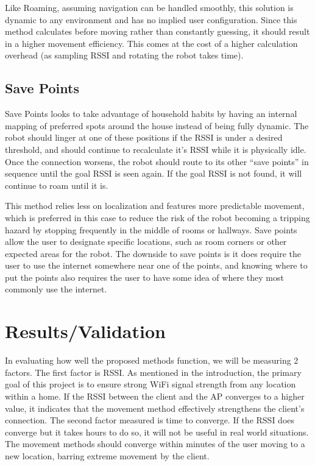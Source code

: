   

Like Roaming, assuming navigation can be handled smoothly, this solution is dynamic to any environment and has no implied user configuration. Since this method calculates before moving rather than constantly guessing, it should result in a higher movement efficiency. This comes at the cost of a higher calculation overhead (as sampling RSSI and rotating the robot takes time).

  

\subsection{Save Points}

Save Points looks to take advantage of household habits by having an internal mapping of preferred spots around the house instead of being fully dynamic. The robot should linger at one of these positions if the RSSI is under a desired threshold, and should continue to recalculate it’s RSSI while it is physically idle. Once the connection worsens, the robot should route to its other “save points” in sequence until the goal RSSI is seen again. If the goal RSSI is not found, it will continue to roam until it is.

  

This method relies less on localization and features more predictable movement, which is preferred in this case to reduce the risk of the robot becoming a tripping hazard by stopping frequently in the middle of rooms or hallways. Save points allow the user to designate specific locations, such as room corners or other expected areas for the robot. The downside to save points is it does require the user to use the internet somewhere near one of the points, and knowing where to put the points also requires the user to have some idea of where they most commonly use the internet.

  

\section{Results/Validation}

In evaluating how well the proposed methods function, we will be measuring 2 factors. The first factor is RSSI. As mentioned in the introduction, the primary goal of this project is to ensure strong WiFi signal strength from any location within a home. If the RSSI between the client and the AP converges to a higher value, it indicates that the movement method effectively strengthens the client’s connection. The second factor measured is time to converge. If the RSSI does converge but it takes hours to do so, it will not be useful in real world situations. The movement methods should converge within minutes of the user moving to a new location, barring extreme movement by the client.

